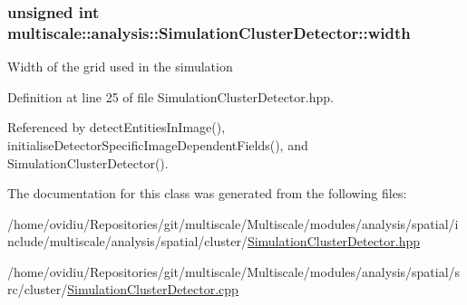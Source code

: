 \hypertarget{classmultiscale_1_1analysis_1_1SimulationClusterDetector_a4c66a82aa1749dce31c767bc4008d904}{
\subsubsection[{width}]{\setlength{\rightskip}{0pt plus 5cm}unsigned int multiscale\-::analysis\-::\-Simulation\-Cluster\-Detector\-::width\hspace{0.3cm}{\ttfamily [private]}}}\label{classmultiscale_1_1analysis_1_1SimulationClusterDetector_a4c66a82aa1749dce31c767bc4008d904}
Width of the grid used in the simulation 

Definition at line 25 of file Simulation\-Cluster\-Detector.\-hpp.



Referenced by detect\-Entities\-In\-Image(), initialise\-Detector\-Specific\-Image\-Dependent\-Fields(), and Simulation\-Cluster\-Detector().



The documentation for this class was generated from the following files\-:\begin{DoxyCompactItemize}
\item 
/home/ovidiu/\-Repositories/git/multiscale/\-Multiscale/modules/analysis/spatial/include/multiscale/analysis/spatial/cluster/\hyperlink{SimulationClusterDetector_8hpp}{Simulation\-Cluster\-Detector.\-hpp}\item 
/home/ovidiu/\-Repositories/git/multiscale/\-Multiscale/modules/analysis/spatial/src/cluster/\hyperlink{SimulationClusterDetector_8cpp}{Simulation\-Cluster\-Detector.\-cpp}\end{DoxyCompactItemize}
